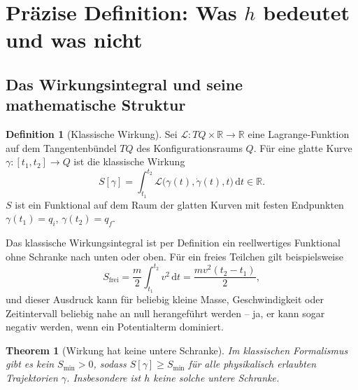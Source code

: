 ﻿\documentclass[12pt,a4paper]{article}
\theoremstyle{plain}
\newtheorem{theorem}{Theorem}[section]
\theoremstyle{definition}
\newtheorem{definition}{Definition}[section]
\theoremstyle{remark}
\newcommand{\Lagr}{\mathcal{L}}
\begin{document}
\section{Präzise Definition: Was $h$ bedeutet und was nicht}

\subsection{Das Wirkungsintegral und seine mathematische Struktur}

\begin{definition}[Klassische Wirkung]\label{def:action}
  Sei $\Lagr: TQ \times \mathbb{R} \to \mathbb{R}$ eine Lagrange-Funktion auf dem
  Tangentenbündel $TQ$ des Konfigurationsraums $Q$. Für eine glatte Kurve
  $\gamma: [t_1, t_2] \to Q$ ist die klassische Wirkung
  \begin{equation}
    S[\gamma] = \int_{t_1}^{t_2} \Lagr\!\bigl(\gamma(t), \dot{\gamma}(t), t\bigr)\,\mathrm{d}t
    \in \mathbb{R}.
    \label{eq:wirkung_def}
  \end{equation}
  $S$ ist ein Funktional auf dem Raum der glatten Kurven mit festen Endpunkten
  $\gamma(t_1) = q_i$, $\gamma(t_2) = q_f$.
\end{definition}

Das klassische Wirkungsintegral ist per Definition ein reellwertiges Funktional ohne
Schranke nach unten oder oben. Für ein freies Teilchen gilt beispielsweise
\begin{equation}
  S_{\mathrm{frei}} = \frac{m}{2}\int_{t_1}^{t_2} v^2\,\mathrm{d}t = \frac{m v^2 (t_2-t_1)}{2},
\end{equation}
und dieser Ausdruck kann für beliebig kleine Masse, Geschwindigkeit oder Zeitintervall
beliebig nahe an null herangeführt werden -- ja, er kann sogar negativ werden, wenn
ein Potentialterm dominiert.

\begin{theorem}[Wirkung hat keine untere Schranke]\label{thm:kein_minimum}
  Im klassischen Formalismus gibt es kein $S_{\min} > 0$, sodass $S[\gamma] \geq S_{\min}$
  für alle physikalisch erlaubten Trajektorien $\gamma$. Insbesondere ist $h$ keine
  solche untere Schranke.
\end{theorem}
\end{document}
